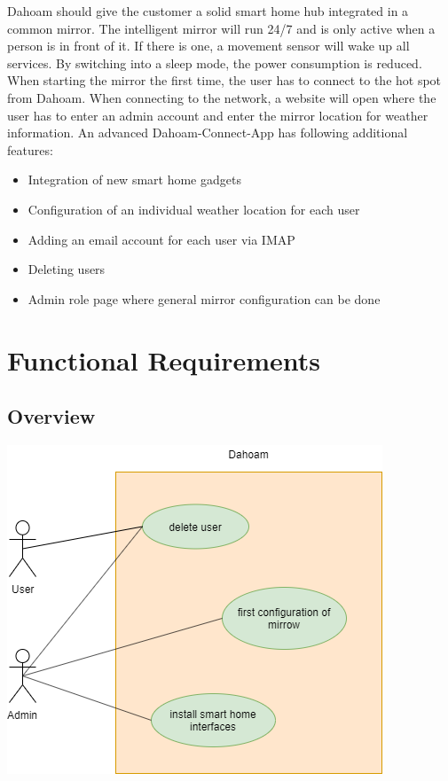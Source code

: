 \documentclass[12pt]{article}
\theoremstyle{definition}
\begin{document}
Dahoam should give the customer a solid smart home hub integrated in a common mirror. The intelligent mirror will run 24/7 and is only active when a person is in front of it. If there is one, a movement sensor will wake up all services. By switching into a sleep mode, the power consumption is reduced. \\
When starting the mirror the first time, the user has to connect to the hot spot from Dahoam. When connecting to the network, a website will open where the user has to enter an admin account and enter the mirror location for weather information.
An advanced Dahoam-Connect-App has following additional features:
\begin{itemize}
    \item Integration of new smart home gadgets
    \item Configuration of an individual weather location for each user
    \item Adding an email account for each user via IMAP
    \item Deleting users
    \item Admin role page where general mirror configuration can be done
\end{itemize}

\pagebreak

\section{Functional Requirements}
\subsection{Overview}
\begin{center}
\includegraphics[scale=.7]{UseCase/UseCase.png}\\
\end{center}
\end{document}
